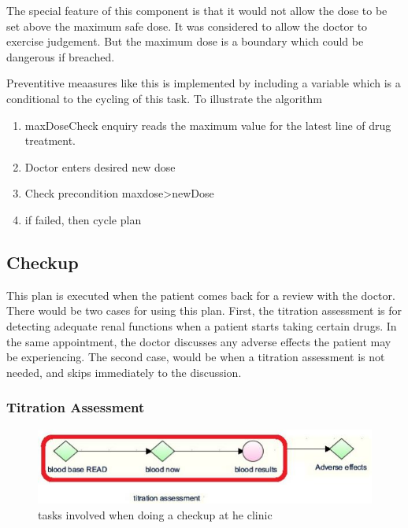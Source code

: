 \documentclass[11pt]{article}
\begin{document}
The special feature of this component is that it would not allow the dose  to be set above the maximum safe dose.  It was considered to allow the doctor to exercise judgement. But the maximum dose is a boundary which could be dangerous if breached. 

Preventitive meaasures like this is implemented by including a variable which is a conditional to the cycling of this task. To illustrate the algorithm
\begin{enumerate}
\item maxDoseCheck enquiry reads the maximum value for the latest line of drug treatment.   
\item Doctor enters desired new dose
\item Check precondition maxdose>newDose
\item if failed, then cycle plan
\end{enumerate}

\subsection{Checkup}
This plan is executed when the patient comes back for a review with the doctor.  There would be two cases for using this plan. First,  the titration assessment is for detecting adequate renal functions when a patient starts taking certain drugs.  In the same appointment, the doctor discusses any adverse effects the patient may be experiencing.  The second case, would be when a titration assessment is not needed, and skips immediately to the discussion.  


\subsubsection{Titration Assessment}

\begin{figure}[ht]
\begin{center}
\includegraphics[scale=1]{tallisCheckup}
\caption{tasks involved when doing a checkup at he clinic}
\label{fig:tallisCheckup}
\end{center}
\end{figure}
\end{document}
